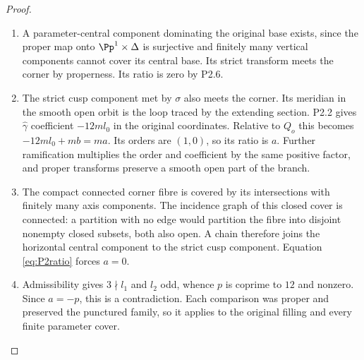 \begin{proof}
\begin{enumerate}[label=\arabic*.,leftmargin=*]
\item A parameter-central component dominating the original base exists, since the proper map onto $\Pp^1\times\Delta$ is surjective and finitely many vertical components cannot cover its central base. Its strict transform meets the corner by properness. Its ratio is zero by P2.6.

\item The strict cusp component met by $\sigma$ also meets the corner. Its meridian in the smooth open orbit is the loop traced by the extending section. P2.2 gives $\widehat\gamma$ coefficient $-12ml_0$ in the original coordinates. Relative to $Q_o$ this becomes $-12ml_0+mb=ma$. Its orders are $(1,0)$, so its ratio is $a$. Further ramification multiplies the order and coefficient by the same positive factor, and proper transforms preserve a smooth open part of the branch.

\item The compact connected corner fibre is covered by its intersections with finitely many axis components. The incidence graph of this closed cover is connected: a partition with no edge would partition the fibre into disjoint nonempty closed subsets, both also open. A chain therefore joins the horizontal central component to the strict cusp component. Equation \eqref{eq:P2ratio} forces $a=0$.

\item Admissibility gives $3\nmid l_1$ and $l_2$ odd, whence $p$ is coprime to $12$ and nonzero. Since $a=-p$, this is a contradiction. Each comparison was proper and preserved the punctured family, so it applies to the original filling and every finite parameter cover.
\end{enumerate}
\end{proof}

